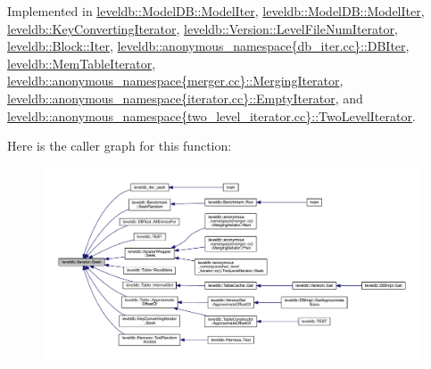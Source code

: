 Implemented in \hyperlink{classleveldb_1_1_model_d_b_1_1_model_iter_ab581a60c36582a06a835bcaf766dc124}{leveldb\+::\+Model\+D\+B\+::\+Model\+Iter}, \hyperlink{classleveldb_1_1_model_d_b_1_1_model_iter_ab581a60c36582a06a835bcaf766dc124}{leveldb\+::\+Model\+D\+B\+::\+Model\+Iter}, \hyperlink{classleveldb_1_1_key_converting_iterator_a6af9b763a5831c2fdcd8c3bebfef6ae4}{leveldb\+::\+Key\+Converting\+Iterator}, \hyperlink{classleveldb_1_1_version_1_1_level_file_num_iterator_adbe855f4a783c2f578e1ff2fbb5259b2}{leveldb\+::\+Version\+::\+Level\+File\+Num\+Iterator}, \hyperlink{classleveldb_1_1_block_1_1_iter_a3dcefc0609937b33c046ac7fafb52ad7}{leveldb\+::\+Block\+::\+Iter}, \hyperlink{classleveldb_1_1anonymous__namespace_02db__iter_8cc_03_1_1_d_b_iter_af213fc2538e3b6002704e465bf0b74a2}{leveldb\+::anonymous\+\_\+namespace\{db\+\_\+iter.\+cc\}\+::\+D\+B\+Iter}, \hyperlink{classleveldb_1_1_mem_table_iterator_a140f9575286994337de9b49ea7fe62cb}{leveldb\+::\+Mem\+Table\+Iterator}, \hyperlink{classleveldb_1_1anonymous__namespace_02merger_8cc_03_1_1_merging_iterator_aa5d93cc49369f5fbd24dee00752c9325}{leveldb\+::anonymous\+\_\+namespace\{merger.\+cc\}\+::\+Merging\+Iterator}, \hyperlink{classleveldb_1_1anonymous__namespace_02iterator_8cc_03_1_1_empty_iterator_ae64a43d5a8bce6a8e38da3a5ddd5ca5f}{leveldb\+::anonymous\+\_\+namespace\{iterator.\+cc\}\+::\+Empty\+Iterator}, and \hyperlink{classleveldb_1_1anonymous__namespace_02two__level__iterator_8cc_03_1_1_two_level_iterator_a35f3800d929d6a99b75fffa7d59f2274}{leveldb\+::anonymous\+\_\+namespace\{two\+\_\+level\+\_\+iterator.\+cc\}\+::\+Two\+Level\+Iterator}.



Here is the caller graph for this function\+:
\nopagebreak
\begin{figure}[H]
\begin{center}
\leavevmode
\includegraphics[width=350pt]{classleveldb_1_1_iterator_a97a556e97ded60c677fbf4de7321ec44_icgraph}
\end{center}
\end{figure}


